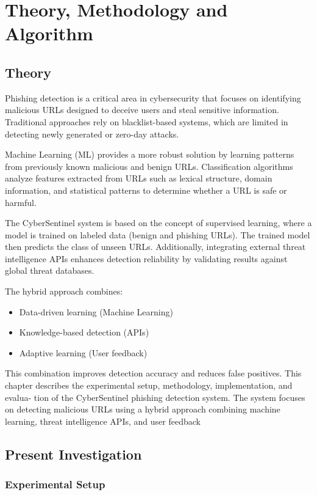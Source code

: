 \chapter{Theory, Methodology and Algorithm}

\section{Theory}

Phishing detection is a critical area in cybersecurity that focuses on identifying malicious URLs designed to deceive users and steal sensitive information. Traditional approaches rely on blacklist-based systems, which are limited in detecting newly generated or zero-day attacks.

Machine Learning (ML) provides a more robust solution by learning patterns from previously known malicious and benign URLs. Classification algorithms analyze features extracted from URLs such as lexical structure, domain information, and statistical patterns to determine whether a URL is safe or harmful.

The CyberSentinel system is based on the concept of supervised learning, where a model is trained on labeled data (benign and phishing URLs). The trained model then predicts the class of unseen URLs. Additionally, integrating external threat intelligence APIs enhances detection reliability by validating results against global threat databases.

The hybrid approach combines:
\begin{itemize}
	\item Data-driven learning (Machine Learning)
	\item Knowledge-based detection (APIs)
	\item Adaptive learning (User feedback)
\end{itemize}

This combination improves detection accuracy and reduces false positives.
This chapter describes the experimental setup, methodology, implementation, and evalua-
tion of the CyberSentinel phishing detection system. The system focuses on detecting malicious
URLs using a hybrid approach combining machine learning, threat intelligence APIs, and user
feedback

\section{Present Investigation}

\subsection{Experimental Setup}

